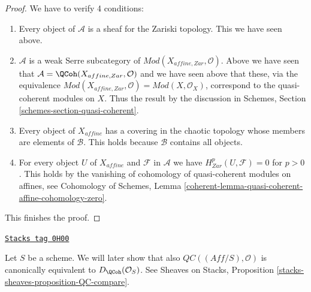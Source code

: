 \begin{proof}
\medskip\noindent
We have to verify 4 conditions:
\begin{enumerate}
\item Every object of $\mathcal{A}$ is a sheaf for the Zariski topology.
This we have seen above.
\item $\mathcal{A}$ is a weak Serre subcategory of
$\textit{Mod}(X_{affine, Zar}, \mathcal{O})$. Above we have
seen that $\mathcal{A} = \QCoh(X_{affine, Zar}, \mathcal{O})$ and
we have seen above that these,
via the equivalence $\textit{Mod}(X_{affine, Zar}, \mathcal{O}) =
\textit{Mod}(X, \mathcal{O}_X)$, correspond to the quasi-coherent modules
on $X$. Thus the result by the discussion in
Schemes, Section \ref{schemes-section-quasi-coherent}.
\item Every object of $X_{affine}$ has a covering in the chaotic
topology whose members are elements of $\mathcal{B}$. This holds
because $\mathcal{B}$ contains all objects.
\item For every object $U$ of $X_{affine}$ and $\mathcal{F}$ in $\mathcal{A}$
we have $H^p_{Zar}(U, \mathcal{F}) = 0$ for $p > 0$.
This holds by the vanishing of cohomology of quasi-coherent modules
on affines, see
Cohomology of Schemes, Lemma
\ref{coherent-lemma-quasi-coherent-affine-cohomology-zero}.
\end{enumerate}
This finishes the proof.
\end{proof}

\begin{remark}[QC compare]
\label{perfect-remark-QC-compare}
\href{https://stacks.math.columbia.edu/tag/0H00}{\texttt{Stacks tag 0H00}}

Let $S$ be a scheme. We will later show that also
$\mathit{QC}((\textit{Aff}/S), \mathcal{O})$
is canonically equivalent to $D_\QCoh(\mathcal{O}_S)$.
See Sheaves on Stacks, Proposition \ref{stacks-sheaves-proposition-QC-compare}.
\end{remark}



